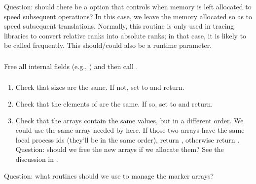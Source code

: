 \documentclass{article}
\begin{document}
Question: should there be a  option that controls when
memory is left allocated to speed subsequent operations?  In this case, we
leave the memory allocated so as to speed subsequent translations.  Normally,
this routine is only used in tracing libraries to convert relative ranks into
absolute ranks; in that case, it is likely to be called frequently.
This should/could also be a runtime parameter.

\subsubsection{}
Free all internal fields (e.g., ) and then
call . 

\subsubsection{}
\begin{enumerate}
\item Check that sizes are the same.  If not, set  to
   and return.
\item Check that the elements of  are the same.  If so,
set  to  and return.
\item Check that the  arrays
  contain the same values, but 
  in a different order.  We could use the same array needed by
   here.  If those two arrays have the same
  local process ids (they'll be in the same order), return
  , otherwise return 
  .  
  Question: should we free the new arrays if we allocate them?  See
  the discussion in .
\end{enumerate}

Question: what routines should we use to manage the marker arrays?
\end{document}
